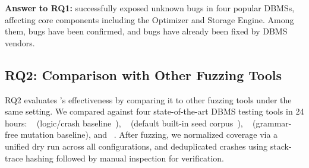 \documentclass[conference]{IEEEtran}
\begin{document}
\begin{answerbox}
\textbf{Answer to RQ1:} 
\tool{} successfully exposed \bugcnt{} unknown bugs in four popular DBMSs, affecting core components including the Optimizer and Storage Engine. Among them, \bugconfirmcnt{} bugs have been confirmed, and \bugfixcnt{} bugs have already been fixed by DBMS vendors.
\end{answerbox}

\subsection{RQ2: Comparison with Other Fuzzing Tools}
RQ2 evaluates \tool{}'s effectiveness by comparing it to other fuzzing tools under the same setting. 
We compared \tool{} against four state-of-the-art DBMS testing tools in 24 hours: \sqlancer{}~\cite{sqlancer} (logic/crash baseline~\cite{zhong2020squirrel,fu2022griffin,liang2023sequence}), \squirrel{}~\cite{zhong2020squirrel} (default built-in seed corpus~\cite{Squirrel_git}), \griffin{}~\cite{fu2022griffin} (grammar-free mutation baseline), and \sedar{}~\cite{fu2024sedar}.
After fuzzing, we normalized coverage via a unified dry run across all configurations, and deduplicated crashes using stack-trace hashing followed by manual inspection for verification.
\end{document}
